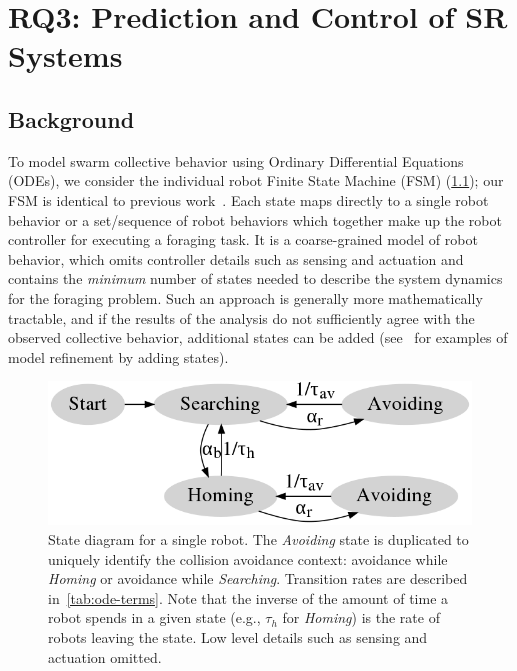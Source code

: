 \chapter{RQ3: Prediction and Control of SR Systems}%
\label{chap:ode-modeling}
%
\section{Background}\label{ode-modeling:sec:background}
%
To model swarm collective behavior using Ordinary Differential Equations (ODEs),
we consider the individual robot Finite State Machine (FSM) (\cref{fig:fsm});
our FSM is identical to previous work~\cite{Lerman2001,Lerman2002}. Each state
maps directly to a single robot behavior or a set/sequence of robot behaviors
which together make up the robot controller for executing a foraging task. It is
a coarse-grained model of robot behavior, which omits controller details such as
sensing and actuation and contains the \emph{minimum} number of states needed to
describe the system dynamics for the foraging problem.  Such an approach is
generally more mathematically tractable, and if the results of the analysis do
not sufficiently agree with the observed collective behavior, additional states
can be added (see~\cite{Lerman2002} for examples of model refinement by adding
states).
%
\begin{figure}[ht]
  \centering
  \includegraphics[width=\linewidth]{figures/chapter3/crw-fsm.png}
  \caption{\label{fig:fsm} \footnotesize{State diagram for a single robot. The
      \emph{Avoiding} state is duplicated to uniquely identify the collision
      avoidance context: avoidance while \emph{Homing} or avoidance while
      \emph{Searching}. Transition rates are described
      in~\cref{tab:ode-terms}. Note that the inverse of the amount of time a
      robot spends in a given state (e.g., $\tau_{h}$ for \emph{Homing}) is the
      rate of robots leaving the state. Low level details such as sensing and
      actuation omitted.}}
\end{figure}


